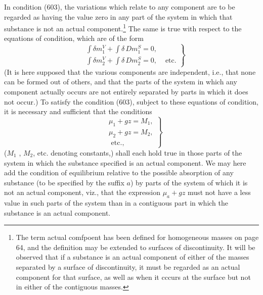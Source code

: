 \documentclass[12pt]{article}
\newcommand{\dd}{\delta}
\begin{document}
In condition (603), the variations which relate to any component are to be regarded as having the value zero in any part of the system in which that substance is not an actual component.\footnote{The term actual comfpoent has been defined for homogeneous masses on page 64, and the definition may be extended to surfaces of discontinuity. It will be observed that if a substance is an actual component of either of the masses separated by a surface of discontinuity, it must be regarded as an actual component for that surface, as well as when it cccurs at the surface but not in either of the contiguous masses.} The same is true with respect to the equations of condition, which are of the form
\begin{equation} \left. \begin{aligned}
&\int \dd m_1^V +\int \dd \, Dm_1^S = 0, \\
&\int \dd m_2^V +\int \dd \, Dm_2^S = 0,  
&\text{ etc.}            \end{aligned} \right\}    \label{616} \end{equation}
(It is here supposed that the various components are independent, i.e., that none can be formed out of others, and that the parts of the system in which any component actually occurs are not entirely separated by parts in which it does not occur.)  To satisfy the condition (603), subject to these equations of condition, it is necessary and sufficient that the conditions
\begin{equation} \left. \begin{aligned}
&\mu_1 + gz = M_1, \\
&\mu_2 + gz = M_2, \\ 
&\text{ etc.},\end{aligned} \right\}    \label{617} \end{equation}
($M_1$ , $M_2$, etc. denoting constants,) shall each hold true in those parts of the system in which the substance specified is an actual component. We may here add the condition of equilibrium relative to the possible absorption of any substance (to be specified by the suffix $a$) by parts of the system of which it is not an actual component, viz., that the expression $\mu_a + gz$ must not have a less value in such parts of the system than in a contiguous part in which the substance is an actual component.
\end{document}
